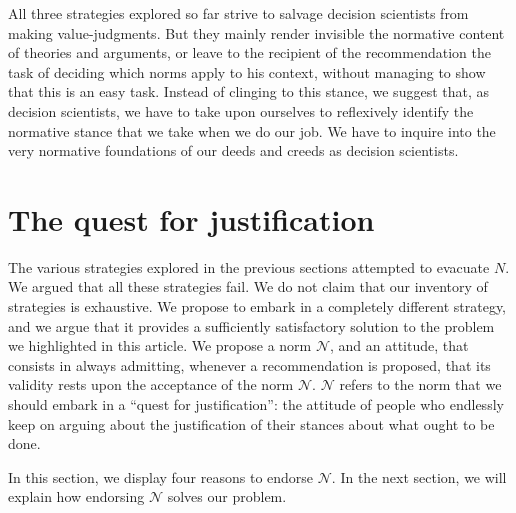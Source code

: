 \documentclass[preprint, french, english, 11pt, authoryear]{elsarticle}%
\newcommand{\adv}{\mathscr{N}}
\begin{document}
All three strategies explored so far strive to salvage decision scientists from making value-judgments. But they mainly render invisible the normative content of theories and arguments, or leave to the recipient of the recommendation the task of deciding which norms apply to his context, without managing to show that this is an easy task. 
Instead of clinging to this stance, we suggest that, as decision scientists, we have to take upon ourselves to reflexively identify the normative stance that we take when we do our job. We have to inquire into the very normative foundations of our deeds and creeds as decision scientists. 

\section{The quest for justification}
The various strategies explored in the previous sections attempted to evacuate $N$. We argued that all these strategies fail. We do not claim that our inventory of strategies is exhaustive. We propose to embark in a completely different strategy, and we argue that it provides a sufficiently satisfactory solution to the problem we highlighted in this article. We propose a norm $\adv$, and an attitude, that consists in always admitting, whenever a recommendation is proposed, that its validity rests upon the acceptance of the norm $\adv$. $\adv$ refers to the norm that we should embark in a ``quest for justification'': the attitude of people who endlessly keep on arguing about the justification of their stances about what ought to be done.

In this section, we display four reasons to endorse $\adv$. In the next section, we will explain how endorsing $\adv$ solves our problem.
\end{document}
